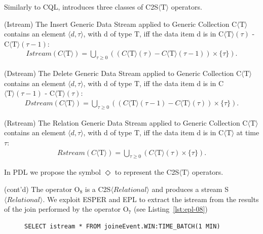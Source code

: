 Similarly to CQL, \river{} introduces three classes of C2S$\langle\mathrm{T}\rangle$ operators.

\begin{Definition}
(Istream) The Insert Generic Data Stream applied to Generic Collection C$\langle\mathrm{T}\rangle$ contains an element $\langle d,\tau \rangle$, with d of type $\mathrm{T}$, iff the data item d is in C$\langle\mathrm{T}\rangle(\tau)$ - C$\langle\mathrm{T}\rangle(\tau - 1)$: 
\noindent\begin{align*}
Istream(C\langle\mathrm{T}\rangle) = \bigcup_{\tau \geq 0} ((C\langle\mathrm{T}\rangle(\tau) - C\langle\mathrm{T}\rangle(\tau - 1)) \times \{\tau\}).
\end{align*} 
\end{Definition}

\begin{Definition}
(Dstream) The Delete Generic Data Stream applied to Generic Collection C$\langle\mathrm{T}\rangle$ contains an element $\langle d,\tau \rangle$, with d of type $\mathrm{T}$, iff the data item d is in C$\langle\mathrm{T}\rangle(\tau - 1)$ - C$\langle\mathrm{T}\rangle(\tau)$: 
\noindent\begin{align*}
Dstream(C\langle\mathrm{T}\rangle) = \bigcup_{\tau \geq 0} ((C\langle\mathrm{T}\rangle(\tau - 1) - C\langle\mathrm{T}\rangle(\tau)) \times \{\tau\}).
\end{align*} 
\end{Definition}

\begin{Definition}
(Rstream) The Relation Generic Data Stream applied to Generic Collection C$\langle\mathrm{T}\rangle$ contains an element $\langle d,\tau \rangle$, with d of type $\mathrm{T}$, iff the data item d is in C$\langle\mathrm{T}\rangle$ at time $\tau$: 
\noindent\begin{align*}
Rstream(C\langle\mathrm{T}\rangle) = \bigcup_{\tau \geq 0} (C\langle\mathrm{T}\rangle(\tau) \times \{\tau\}).
\end{align*} 
\end{Definition}

\noindent
In PDL we propose the symbol $\Diamond$ to represent the C2S$\langle\mathrm{T}\rangle$ operators. 

\begin{Example}
(cont'd) The operator O$_8$ is a C2S$\langle Relational \rangle$ and produces a stream S$\langle Relational \rangle$. We exploit ESPER and EPL to extract the istream from the results of the join performed by the operator O$_7$ (see Listing~\ref{lst:epl-08})

\begin{figure}[ht]
\begin{minipage}{0.95\linewidth}
\begin{lstlisting}[caption={EPL query, applied by O$_8$ operators, to create the stream after the join operation},label=lst:epl-08,style=ESPER]
     SELECT istream * FROM joineEvent.WIN:TIME_BATCH(1 MIN)
\end{lstlisting}
\end{minipage}
\end{figure}
\end{Example}


